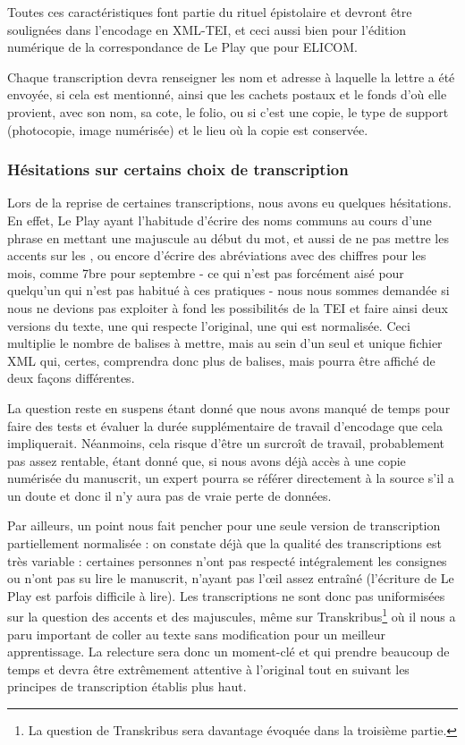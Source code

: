 Toutes ces caractéristiques font partie du rituel épistolaire et devront être soulignées dans l'encodage en XML-TEI, et ceci aussi bien pour l'édition numérique de la correspondance de Le Play que pour ELICOM.

Chaque transcription devra renseigner les nom et adresse à laquelle la lettre a été envoyée, si cela est mentionné, ainsi que les cachets postaux et le fonds d'où elle provient, avec son nom, sa cote, le folio, ou si c'est une copie, le type de support (photocopie, image numérisée) et le lieu où la copie est conservée.

\subsubsection{Hésitations sur certains choix de transcription}

Lors de la reprise de certaines transcriptions, nous avons eu quelques hésitations. En effet, Le Play ayant l'habitude d'écrire des noms communs au cours d'une phrase en mettant une majuscule au début du mot, et aussi de ne pas mettre les accents sur les , ou encore d'écrire des abréviations avec des chiffres pour les mois, comme 7bre pour septembre - ce qui n'est pas forcément aisé pour quelqu'un qui n'est pas habitué à ces pratiques - nous nous sommes demandée si nous ne devions pas exploiter à fond les possibilités de la TEI et faire ainsi deux versions du texte, une qui respecte l'original, une qui est normalisée. Ceci multiplie le nombre de balises à mettre, mais au sein d'un seul et unique fichier XML qui, certes, comprendra donc plus de balises, mais pourra être affiché de deux façons différentes.

La question reste en suspens étant donné que nous avons manqué de temps pour faire des tests et évaluer la durée supplémentaire de travail d'encodage que cela impliquerait.
Néanmoins, cela risque d'être un surcroît de travail, probablement pas assez rentable, étant donné que, si nous avons déjà accès à une copie numérisée du manuscrit, un expert pourra se référer directement à la source s'il a un doute et donc il n'y aura pas de vraie perte de données.

Par ailleurs, un point nous fait pencher pour une seule version de transcription partiellement normalisée : on constate déjà que la qualité des transcriptions est très variable : certaines personnes n'ont pas respecté intégralement les consignes ou n'ont pas su lire le manuscrit, n'ayant pas l'\oe il assez entraîné (l'écriture de Le Play est parfois difficile à lire). Les transcriptions ne sont donc pas uniformisées sur la question des accents et des majuscules, même sur Transkribus\footnote{La question de Transkribus sera davantage évoquée dans la troisième partie.} où il nous a paru important de coller au texte sans modification pour un meilleur apprentissage.
La relecture sera donc un moment-clé et qui prendre beaucoup de temps et devra être extrêmement attentive à l'original tout en suivant les principes de transcription établis plus haut.
 
